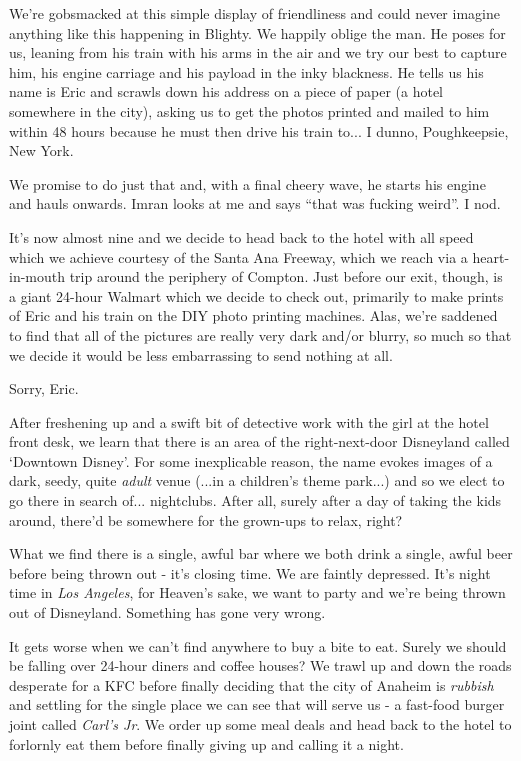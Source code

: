 \documentclass[a5paper,titlepage,11pt,draft]{book}
\begin{document}
We're gobsmacked at this simple display of friendliness and could never imagine anything like this happening in Blighty.  We happily oblige the man.  He poses for us, leaning from his train with his arms in the air and we try our best to capture him, his engine carriage and his payload in the inky blackness.  He tells us his name is Eric and scrawls down his address on a piece of paper (a hotel somewhere in the city), asking us to get the photos printed and mailed to him within 48 hours because he must then drive his train to... I dunno, Poughkeepsie, New York.

We promise to do just that and, with a final cheery wave, he starts his engine and hauls onwards.  Imran looks at me and says ``that was fucking weird''.  I nod.

It's now almost nine and we decide to head back to the hotel with all speed which we achieve courtesy of the Santa Ana Freeway, which we reach via a heart-in-mouth trip around the periphery of Compton.  Just before our exit, though, is a giant 24-hour Walmart which we decide to check out, primarily to make prints of Eric and his train on the DIY photo printing machines.  Alas, we're saddened to find that all of the pictures are really very dark and/or blurry, so much so that we decide it would be less embarrassing to send nothing at all.

Sorry, Eric.

After freshening up and a swift bit of detective work with the girl at the hotel front desk, we learn that there is an area of the right-next-door Disneyland called `Downtown Disney'.  For some inexplicable reason, the name evokes images of a dark, seedy, quite \emph{adult} venue (...in a children's theme park...) and so we elect to go there in search of... nightclubs.  After all, surely after a day of taking the kids around, there'd be somewhere for the grown-ups to relax, right?

What we find there is a single, awful bar where we both drink a single, awful beer before being thrown out - it's closing time.  We are faintly depressed.  It's night time in \emph{Los Angeles}, for Heaven's sake, we want to party and we're being thrown out of Disneyland.  Something has gone very wrong.

It gets worse when we can't find anywhere to buy a bite to eat.  Surely we should be falling over 24-hour diners and coffee houses?  We trawl up and down the roads desperate for a KFC before finally deciding that the city of Anaheim is \emph{rubbish} and settling for the single place we can see that will serve us - a fast-food burger joint called \emph{Carl's Jr}.  We order up some meal deals and head back to the hotel to forlornly eat them before finally giving up and calling it a night.
\end{document}
